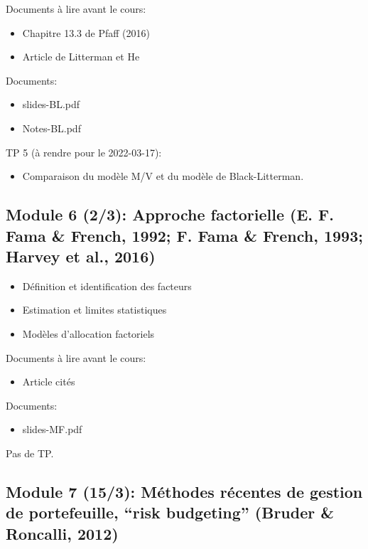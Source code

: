 \documentclass[
  11pt,
]{article}
\providecommand{\tightlist}{%
  \setlength{\itemsep}{0pt}\setlength{\parskip}{0pt}}
\begin{document}
Documents à lire avant le cours:

\begin{itemize}
\tightlist
\item
  Chapitre 13.3 de Pfaff (2016)
\item
  Article de Litterman et He
\end{itemize}

Documents:

\begin{itemize}
\tightlist
\item
  slides-BL.pdf
\item
  Notes-BL.pdf
\end{itemize}

TP 5 (à rendre pour le 2022-03-17):

\begin{itemize}
\tightlist
\item
  Comparaison du modèle M/V et du modèle de Black-Litterman.
\end{itemize}

\hypertarget{module-6-23-approche-factorielle-fama1992-fama1993-harvey2016a}{%
\subsection{Module 6 (2/3): Approche factorielle (E. F. Fama \& French,
1992; F. Fama \& French, 1993; Harvey et al.,
2016)}\label{module-6-23-approche-factorielle-fama1992-fama1993-harvey2016a}}

\begin{itemize}
\tightlist
\item
  Définition et identification des facteurs
\item
  Estimation et limites statistiques
\item
  Modèles d'allocation factoriels
\end{itemize}

Documents à lire avant le cours:

\begin{itemize}
\tightlist
\item
  Article cités
\end{itemize}

Documents:

\begin{itemize}
\tightlist
\item
  slides-MF.pdf
\end{itemize}

Pas de TP.

\hypertarget{module-7-153-muxe9thodes-ruxe9centes-de-gestion-de-portefeuille-risk-budgeting-bruder2012}{%
\subsection{Module 7 (15/3): Méthodes récentes de gestion de
portefeuille, ``risk budgeting'' (Bruder \& Roncalli,
2012)}\label{module-7-153-muxe9thodes-ruxe9centes-de-gestion-de-portefeuille-risk-budgeting-bruder2012}}
\end{document}
